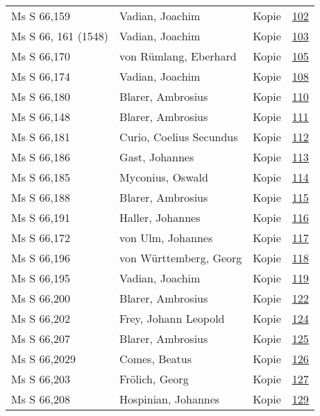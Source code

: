 \documentclass[10pt,a4paper,landscape]{report}
\begin{document}
\begin{longtable}{p{16cm}p{4cm}lr}
Ms S 66,159	&	Vadian, Joachim	&	Kopie	&	\href{http://130.60.24.72/assignment/102}{102}\\
Ms S 66, 161 (1548)	&	Vadian, Joachim	&	Kopie	&	\href{http://130.60.24.72/assignment/103}{103}\\
Ms S 66,170	&	von Rümlang, Eberhard	&	Kopie	&	\href{http://130.60.24.72/assignment/105}{105}\\
Ms S 66,174	&	Vadian, Joachim	&	Kopie	&	\href{http://130.60.24.72/assignment/108}{108}\\
Ms S 66,180	&	Blarer, Ambrosius	&	Kopie	&	\href{http://130.60.24.72/assignment/110}{110}\\
Ms S 66,148	&	Blarer, Ambrosius	&	Kopie	&	\href{http://130.60.24.72/assignment/111}{111}\\
Ms S 66,181	&	Curio, Coelius Secundus	&	Kopie	&	\href{http://130.60.24.72/assignment/112}{112}\\
Ms S 66,186	&	Gast, Johannes	&	Kopie	&	\href{http://130.60.24.72/assignment/113}{113}\\
Ms S 66,185	&	Myconius, Oswald	&	Kopie	&	\href{http://130.60.24.72/assignment/114}{114}\\
Ms S 66,188	&	Blarer, Ambrosius	&	Kopie	&	\href{http://130.60.24.72/assignment/115}{115}\\
Ms S 66,191	&	Haller, Johannes	&	Kopie	&	\href{http://130.60.24.72/assignment/116}{116}\\
Ms S 66,172	&	von Ulm, Johannes	&	Kopie	&	\href{http://130.60.24.72/assignment/117}{117}\\
Ms S 66,196	&	von Württemberg, Georg	&	Kopie	&	\href{http://130.60.24.72/assignment/118}{118}\\
Ms S 66,195	&	Vadian, Joachim	&	Kopie	&	\href{http://130.60.24.72/assignment/119}{119}\\
Ms S 66,200	&	Blarer, Ambrosius	&	Kopie	&	\href{http://130.60.24.72/assignment/122}{122}\\
Ms S 66,202	&	Frey, Johann Leopold	&	Kopie	&	\href{http://130.60.24.72/assignment/124}{124}\\
Ms S 66,207	&	Blarer, Ambrosius	&	Kopie	&	\href{http://130.60.24.72/assignment/125}{125}\\
Ms S 66,2029	&	Comes, Beatus	&	Kopie	&	\href{http://130.60.24.72/assignment/126}{126}\\
Ms S 66,203	&	Frölich, Georg	&	Kopie	&	\href{http://130.60.24.72/assignment/127}{127}\\
Ms S 66,208	&	Hospinian, Johannes	&	Kopie	&	\href{http://130.60.24.72/assignment/129}{129}\\

\end{longtable}
\end{document}
